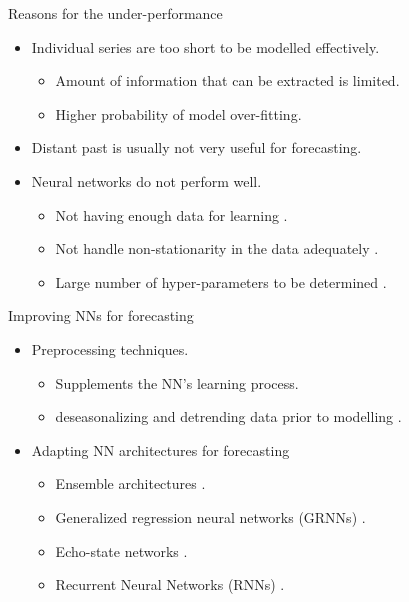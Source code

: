 \documentclass{beamer}
\begin{document}
   \begin{frame}{Reasons for the under-performance}
  	\begin{itemize}
  	\item Individual series are too short to be modelled effectively.
  		\vspace{1.5mm}
		\begin{itemize}\color{blue}
		\item Amount of information that can be extracted is limited.
		\item Higher probability of model over-fitting.
		\end{itemize}	
		\vspace{2.0mm}
	\item Distant past is usually not very useful for forecasting.
	\vspace{2.0mm}
	\item Neural networks do not perform well.
	  \begin{itemize}\color{blue}
		\item Not having enough data for learning \cite{Zhang1998-tq}.
		\item Not handle non-stationarity in the data adequately \cite{Hyndman2016-ej}.
		\item Large number of hyper-parameters to be determined \cite{Yan2012-dh}.		
	  \end{itemize}		
 	\end{itemize}
   \end{frame}
%   
    \begin{frame}{Improving NNs for forecasting}
  	\begin{itemize}
	\item Preprocessing techniques.
	\vspace{0.8mm}
	  \begin{itemize}\color{blue}
		\item Supplements the NN's learning process.
		\item deseasonalizing and detrending data prior to modelling \cite{Nelson1999-bd, Ben_Taieb2011-iu,Zhang2005-pk}.
	  \end{itemize}	
	  \vspace{1.0mm}
	\item Adapting NN architectures for forecasting
	\vspace{0.8mm}
	  \begin{itemize}\color{blue}
		\item Ensemble architectures \cite{Rahman2016-os, Barrow2016-yv}.
		\item Generalized regression neural networks (GRNNs) \cite{Yan2012-dh}.
		\item Echo-state networks \cite{Ilies2007-ej}.
		\item Recurrent Neural Networks (RNNs) \cite{Zimmermann2012-cp,Fei2015-vh}. 
	  \end{itemize}			
 	\end{itemize}
   \end{frame}
   
\end{document}
